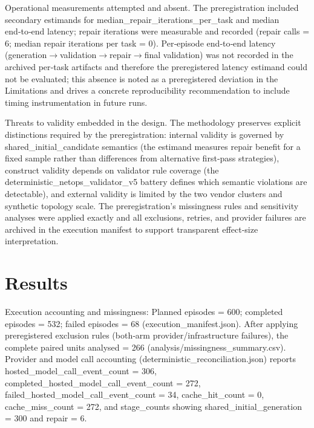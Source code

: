 \documentclass[conference]{IEEEtran}
\begin{document}
Operational measurements attempted and absent.  The preregistration included secondary estimands for median\_repair\_iterations\_per\_task and median end‑to‑end latency; repair iterations were measurable and recorded (repair calls = 6; median repair iterations per task = 0). Per‑episode end‑to‑end latency (generation\ensuremath{\rightarrow}validation\ensuremath{\rightarrow}repair\ensuremath{\rightarrow}final validation) was not recorded in the archived per‑task artifacts and therefore the preregistered latency estimand could not be evaluated; this absence is noted as a preregistered deviation in the Limitations and drives a concrete reproducibility recommendation to include timing instrumentation in future runs.

Threats to validity embedded in the design.  The methodology preserves explicit distinctions required by the preregistration: internal validity is governed by shared\_initial\_candidate semantics (the estimand measures repair benefit for a fixed sample rather than differences from alternative first‑pass strategies), construct validity depends on validator rule coverage (the deterministic\_netops\_validator\_v5 battery defines which semantic violations are detectable), and external validity is limited by the two vendor clusters and synthetic topology scale. The preregistration's missingness rules and sensitivity analyses were applied exactly and all exclusions, retries, and provider failures are archived in the execution manifest to support transparent effect‑size interpretation.

\section{Results}
Execution accounting and missingness: Planned episodes = 600; completed episodes = 532; failed episodes = 68 (execution\_manifest.json). After applying preregistered exclusion rules (both‑arm provider/infrastructure failures), the complete paired units analysed = 266 (analysis/missingness\_summary.csv). Provider and model call accounting (deterministic\_reconciliation.json) reports hosted\_model\_call\_event\_count = 306, completed\_hosted\_model\_call\_event\_count = 272, failed\_hosted\_model\_call\_event\_count = 34, cache\_hit\_count = 0, cache\_miss\_count = 272, and stage\_counts showing shared\_initial\_generation = 300 and repair = 6.
\end{document}
